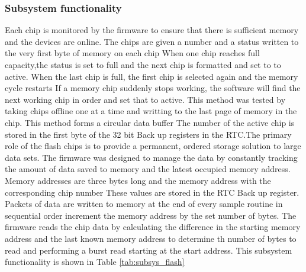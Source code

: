 \subsubsection{Subsystem functionality}

Each chip is monitored by the firmware to ensure that there is sufficient memory and the devices are online. The chips are given a number and a status written to the very first byte of memory on each chip When one chip reaches full capacity,the status is set to full and the next chip is formatted and set to to active. When the last chip is full, the first chip is selected again and the memory cycle restarts If a memory chip suddenly stops working, the software will find the next working chip in order and set that to active. This method was tested by taking chips offline one at a time and writting to the last page of memory in the chip. This method forms a circular data buffer The number of the active chip is stored in the first byte of the 32 bit Back up registers in the RTC.The primary role of the flash chips is to provide a permanent, ordered storage solution to large data sets. The firmware was designed to manage the data by constantly tracking the amount of data saved to memory and the latest occupied memory address. Memory addresses are three bytes long and the memory address with the corresponding chip number These values are stored in the RTC Back up register. Packets of data are written to memory at the end of every sample routine in sequential order increment the memory address by the set number of bytes. The firmware reads the chip data by calculating the difference in the starting memory address and the last known memory address to determine th number of bytes to read and performing a burst read starting at the start address. This subsystem functionality is shown in Table \ref{tab:subsys_flash}

